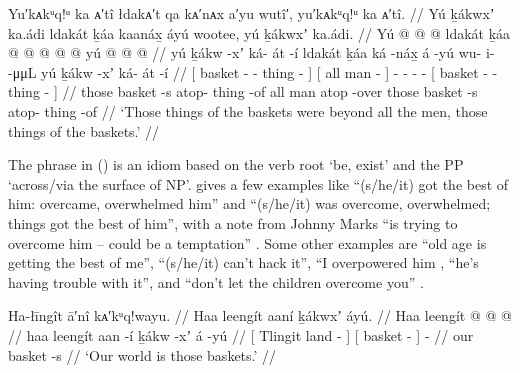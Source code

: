 \ex\label{ex:92-209-basket-things-all-men-too-much}%
%
\begingl
	\glpreamble	Yu′kᴀkᵘq!ᵘ ka ᴀ′tî łdakᴀ′t qa kᴀ′nᴀx a′yu wutî′, yu′kᴀkᵘq!ᵘ ka ᴀ′tî. //
	\glpreamble	Yú ḵákwxʼ ka.ádi ldakát ḵáa kaanáx̱ áyú wootee, yú ḵákwxʼ ka.ádi. //
	\gla	{} Yú  @ {}  @ {} @ {} {}
		{} ldakát ḵáa  @ {} {}
		 @ {}
		 @ {} @ {} @ {}
		{} yú  @ {}  @ {} @ {} {} //
	\glb	{} yú ḵákw -xʼ ká- át -í {}
		{} ldakát ḵáa ká -náx̱ {}
		á -yú
		wu- i-  -μμL
		{} yú ḵákw -xʼ ká- át -í {} //
	\glc	{}[  basket - - thing - {}]
		{}[ all man  - {}]
		 -
		- -  -
		{}[  basket - - thing - {}] //
	\gld	{} those basket -s atop- thing -of {}
		{} all man atop -over {}
		 {}
		 {} {} {}
		{} those basket -s atop- thing -of {} //
	\glft	‘Those things of the baskets were beyond all the men, those things of the baskets.’
		//
\endgl
\xe

The phrase  in (\lastx) is an idiom based on the verb root  ‘be, exist’ and the PP  ‘across/via the surface of NP’.
\citeauthor{leer:1976} gives a few examples like  “(s/he/it) got the best of him: overcame, overwhelmed him” and  “(s/he/it) was overcome, overwhelmed; things got the best of him”, with a note from  Johnny Marks “is trying to overcome him – could be a temptation” \parencite[389]{leer:1976}.
Some other examples are  “old age is getting the best of me”,  “(s/he/it) can’t hack it”,  “I overpowered him \parencite[all][06/162]{leer:1973},  “he’s having trouble with it”, and  “don’t let the children overcome you” \parencite[both][06/164]{leer:1973}.

\ex\label{ex:92-210-tlingit-land-baskets}%
%
\begingl
	\glpreamble	Ha-łīngît ā′nî kᴀ′kᵘq!wayu. //
	\glpreamble	Haa leengít aaní ḵákwxʼ áyú. //
	\gla	{} Haa leengít  @ {} {}
		{}  @ {} {}
		 @ {} //
	\glb	{} haa leengít aan -í {}
		{} ḵákw -xʼ {}
		á -yú //
	\glc	{}[  Tlingit land - {}]
		{}[ basket - {}]
		 - //
	\gld	{} our  {} {} {}
		{} basket -s {}
		 {} //
	\glft	‘Our world is those baskets.’
		//
\endgl
\xe

